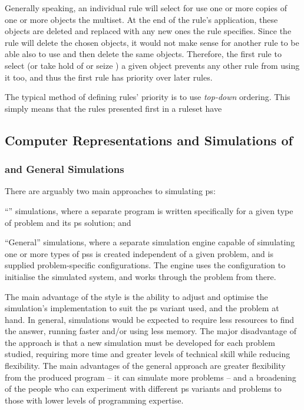 Generally speaking, an individual rule will select for use one or more copies of one or more objects the multiset.  At the end of the rule's application, these objects are deleted and replaced with any new ones the rule specifies.  Since the rule will delete the chosen objects, it would not make sense for another rule to be able also to use and then delete the same objects.  Therefore, the first rule to select (or take hold of or seize \etc{}) a given object prevents any other rule from using it too, and thus the first rule has priority over later rules.

The typical method of defining rules' priority is to use \emph{top-down} ordering.  This simply means that the rules presented first in a \gls{ruleset} have 

\subsection{Computer Representations and Simulations of }

\subsubsection{\Adhoc{} and General Simulations}
There are arguably two main approaches to simulating \gls{ps}:
\begin{inparaenum}[a)]
\item ``\Adhoc{}'' simulations, where a separate program is written specifically for a given type of problem and its \gls{ps} solution; and
\item ``General'' simulations, where a separate simulation engine capable of simulating one or more types of \glspl{ps} is created independent of a given problem, and is supplied problem-specific configurations.  The engine uses the configuration to initialise the simulated system, and works through the problem from there.
\end{inparaenum}

The main advantage of the \adhoc{} style is the ability to adjust and optimise the simulation's implementation to suit the \gls{ps} variant used, and the problem at hand.  In general, \adhoc{} simulations would be expected to require less resources to find the answer, \eg{} running faster and/or using less memory.  The major disadvantage of the \adhoc{} approach is that a new simulation must be developed for each problem studied, requiring more time and greater levels of technical skill while reducing flexibility.  The main advantages of the general approach are greater flexibility from the produced program -- \ie{} it can simulate more problems -- and a broadening of the people who can experiment with different \gls{ps} variants and problems to those with lower levels of programming expertise.


